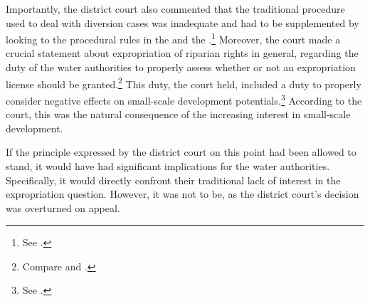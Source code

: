 Importantly, the district court also commented that the traditional procedure used to deal with diversion cases was inadequate and had to be supplemented by looking to the procedural rules in the \cite{ea59} and the \cite{paa67}.\footnote{See \cite[21]{jorpeland09}.} Moreover, the court made a crucial statement about expropriation of riparian rights in general, regarding the duty of the water authorities to properly assess whether or not an expropriation license should be granted.\footnote{Compare \dni\cite[12]{ea59} and \dni\cite[16]{paa67}.} This duty, the court held, included a duty to properly consider negative effects on small-scale development potentials.\footnote{See \cite[22]{jorpeland09}.} According to the court, this was the natural consequence of the increasing interest in small-scale development. 

If the principle expressed by the district court on this point had been allowed to stand, it would have had significant implications for the water authorities. Specifically, it would directly confront their traditional lack of interest in the expropriation question. However, it was not to be, as the district court's decision was overturned on appeal.

